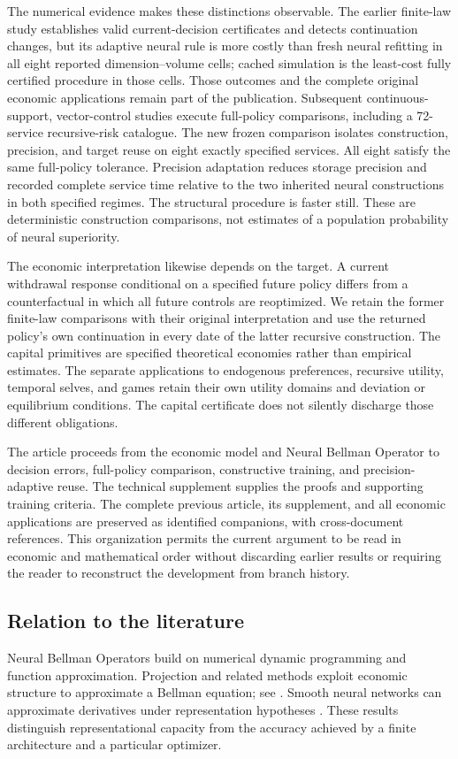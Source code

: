 \documentclass[ecta,nameyear,draft]{econsocart}
\theoremstyle{definition}
\theoremstyle{remark}
\begin{document}
The numerical evidence makes these distinctions observable. The earlier
finite-law study establishes valid current-decision certificates and detects
continuation changes, but its adaptive neural rule is more costly than fresh
neural refitting in all eight reported dimension--volume cells; cached
simulation is the least-cost fully certified procedure in those cells. Those
outcomes and the complete original economic applications remain part of the
publication. Subsequent continuous-support, vector-control studies execute
full-policy comparisons, including a 72-service recursive-risk catalogue.
The new frozen comparison isolates construction, precision, and target reuse
on eight exactly specified services. All eight satisfy the same full-policy
tolerance. Precision adaptation reduces storage precision and recorded
complete service time relative to the two inherited neural constructions
in both specified regimes. The structural procedure is faster still.
These are deterministic construction comparisons, not estimates of a
population probability of neural superiority.

The economic interpretation likewise depends on the target. A current
withdrawal response conditional on a specified future policy differs from
a counterfactual in which all future controls are reoptimized. We retain
the former finite-law comparisons with their original interpretation and
use the returned policy's own continuation in every date of the latter
recursive construction. The capital primitives are specified theoretical
economies rather than empirical estimates. The separate applications to
endogenous preferences, recursive utility, temporal selves, and games retain
their own utility domains and deviation or equilibrium conditions. The
capital certificate does not silently discharge those different obligations.

The article proceeds from the economic model and Neural Bellman Operator
to decision errors, full-policy comparison, constructive training, and
precision-adaptive reuse. The technical supplement supplies the proofs and
supporting training criteria. The complete previous article, its supplement,
and all economic applications are preserved as identified companions, with
cross-document references. This organization permits the current argument
to be read in economic and mathematical order without discarding earlier
results or requiring the reader to reconstruct the development from branch
history.

\subsection{Relation to the literature}
Neural Bellman Operators build on numerical dynamic programming and function approximation. Projection and related methods exploit economic structure to approximate a Bellman equation; see \citet{judd1998}. Smooth neural networks can approximate derivatives under representation hypotheses \citep{hornik1990}. These results distinguish representational capacity from the accuracy achieved by a finite architecture and a particular optimizer.
\end{document}
